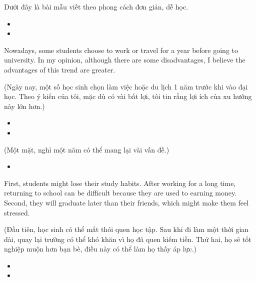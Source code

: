 \documentclass{../templateWriting/cdwriting}
\begin{document}

Dưới đây là bài mẫu viết theo phong cách đơn giản, dễ học.

\begin{itemize}
\item {}
\item {}
\end{itemize}

Nowadays, some students choose to work or travel for a year before going to university. In my opinion, although there are some disadvantages, I believe the advantages of this trend are greater.

(Ngày nay, một số học sinh chọn làm việc hoặc du lịch 1 năm trước khi vào đại học. Theo ý kiến của tôi, mặc dù có vài bất lợi, tôi tin rằng lợi ích của xu hướng này lớn hơn.)

\begin{itemize}
\item {}
\item {}
\end{itemize}

(Một mặt, nghỉ một năm có thể mang lại vài vấn đề.)
\begin{itemize}
\item {}
\end{itemize}

First, students might lose their study habits. After working for a long time, returning to school can be difficult because they are used to earning money. Second, they will graduate later than their friends, which might make them feel stressed.

(Đầu tiên, học sinh có thể mất thói quen học tập. Sau khi đi làm một thời gian dài, quay lại trường có thể khó khăn vì họ đã quen kiếm tiền. Thứ hai, họ sẽ tốt nghiệp muộn hơn bạn bè, điều này có thể làm họ thấy áp lực.)

\begin{itemize}
\item {}
\item {}
\end{itemize}
\end{document}
